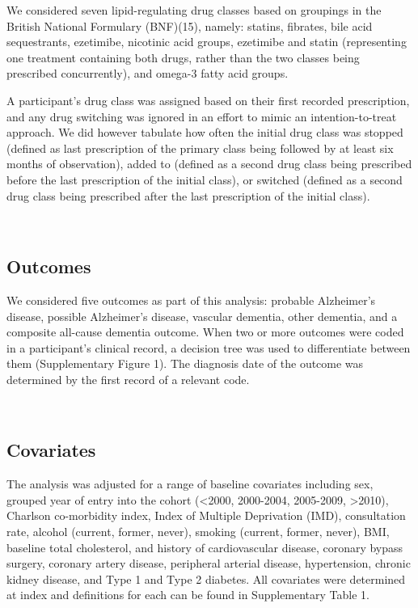\documentclass[
]{article}
\begin{document}
We considered seven lipid-regulating drug classes based on groupings in the British National Formulary (BNF)(15), namely: statins, fibrates, bile acid sequestrants, ezetimibe, nicotinic acid groups, ezetimibe and statin (representing one treatment containing both drugs, rather than the two classes being prescribed concurrently), and omega-3 fatty acid groups.

A participant's drug class was assigned based on their first recorded prescription, and any drug switching was ignored in an effort to mimic an intention-to-treat approach. We did however tabulate how often the initial drug class was stopped (defined as last prescription of the primary class being followed by at least six months of observation), added to (defined as a second drug class being prescribed before the last prescription of the initial class), or switched (defined as a second drug class being prescribed after the last prescription of the initial class).

~

\hypertarget{outcomes}{%
\subsection{Outcomes}\label{outcomes}}

We considered five outcomes as part of this analysis: probable Alzheimer's disease, possible Alzheimer's disease, vascular dementia, other dementia, and a composite all-cause dementia outcome. When two or more outcomes were coded in a participant's clinical record, a decision tree was used to differentiate between them (Supplementary Figure 1). The diagnosis date of the outcome was determined by the first record of a relevant code.

~

\hypertarget{covariates}{%
\subsection{Covariates}\label{covariates}}

The analysis was adjusted for a range of baseline covariates including sex, grouped year of entry into the cohort (\textless2000, 2000-2004, 2005-2009, \textgreater2010), Charlson co-morbidity index, Index of Multiple Deprivation (IMD), consultation rate, alcohol (current, former, never), smoking (current, former, never), BMI, baseline total cholesterol, and history of cardiovascular disease, coronary bypass surgery, coronary artery disease, peripheral arterial disease, hypertension, chronic kidney disease, and Type 1 and Type 2 diabetes. All
covariates were determined at index and definitions for each can be found in Supplementary Table 1.
\end{document}
